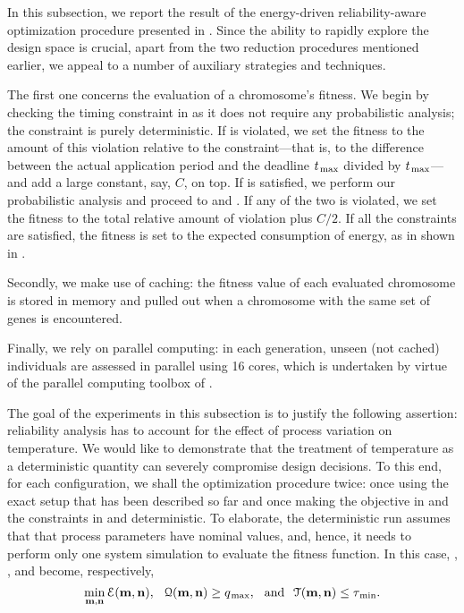 In this subsection, we report the result of the energy-driven reliability-aware optimization procedure presented in .
Since the ability to rapidly explore the design space is crucial, apart from the two reduction procedures mentioned earlier, we appeal to a number of auxiliary strategies and techniques.

The first one concerns the evaluation of a chromosome's fitness.
We begin by checking the timing constraint in  as it does not require any probabilistic analysis; the constraint is purely deterministic.
If  is violated, we set the fitness to the amount of this violation relative to the constraint---that is, to the difference between the actual application period and the deadline $t_{\text{\kern0.1emmax}}$ divided by $t_{\text{\kern0.1emmax}}$---and add a large constant, say, $C$, on top.
If  is satisfied, we perform our probabilistic analysis and proceed to  and .
If any of the two is violated, we set the fitness to the total relative amount of violation plus $C/2$.
If all the constraints are satisfied, the fitness is set to the expected consumption of energy, as in shown in .

Secondly, we make use of caching: the fitness value of each evaluated chromosome is stored in memory and pulled out when a chromosome with the same set of genes is encountered.

Finally, we rely on parallel computing: in each generation, unseen (not cached) individuals are assessed in parallel using 16  cores, which is undertaken by virtue of the parallel computing toolbox of  \cite{matlab}.

The goal of the experiments in this subsection is to justify the following assertion: reliability analysis has to account for the effect of process variation on temperature.
We would like to demonstrate that the treatment of temperature as a deterministic quantity can severely compromise design decisions.
To this end, for each configuration, we shall the optimization procedure twice: once using the exact setup that has been described so far and once making the objective in  and the constraints in  and  deterministic.
To elaborate, the deterministic run assumes that that process parameters have nominal values, and, hence, it needs to perform only one system simulation to evaluate the fitness function.
In this case, , , and  become, respectively,
\[
  \min_{\mathbf{m}, \mathbf{n}} \EuScript{E}(\mathbf{m}, \mathbf{n}), \hspace{0.7em} \EuScript{Q}(\mathbf{m}, \mathbf{n}) \geq q_{\text{\kern0.1emmax}}, \hspace{0.7em} \text{and} \hspace{0.7em} \EuScript{T}(\mathbf{m}, \mathbf{n}) \leq \tau_{\text{\kern0.1emmin}}.
\]

